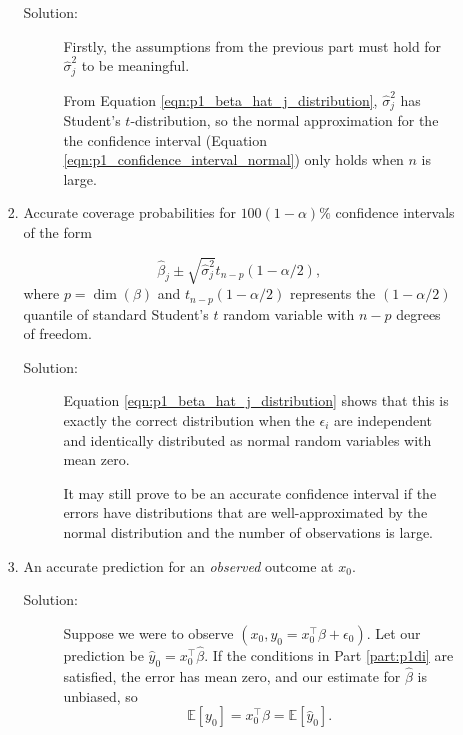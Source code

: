 \documentclass[letterpaper,11pt]{article}
\begin{document}
\begin{enumerate}
\begin{enumerate}
\begin{enumerate}
      \begin{description}
      \item[Solution:] Firstly, the assumptions from the previous part must hold
        for $\hat{\sigma}_j^2$ to be meaningful.

        From Equation \ref{eqn:p1_beta_hat_j_distribution}, $\hat{\sigma}_j^2$
        has Student's $t$-distribution, so the normal approximation for the the
        confidence interval (Equation \ref{eqn:p1_confidence_interval_normal})
        only holds when $n$ is large.
      \end{description}
            
    \item Accurate coverage probabilities for $100\left(1 - \alpha\right)\%$
      confidence intervals of the form

      \begin{equation}
        \hat{\beta}_j \pm \sqrt{\hat{\sigma}_j^2}t_{n-p}\left(1-\alpha/2\right),
        \label{eqn:p1_confidence_interval_t}
      \end{equation}
      where $p = \dim\left(\beta\right)$ and $t_{n-p}\left(1-\alpha/2\right)$
      represents the $\left(1-\alpha/2\right)$ quantile of standard Student's
      $t$ random variable with $n - p$ degrees of freedom.

      \begin{description}
      \item[Solution:] Equation \ref{eqn:p1_beta_hat_j_distribution} shows that
        this is exactly the correct distribution when the $\epsilon_i$ are
        independent and identically distributed as normal random variables with
        mean zero.

        It may still prove to be an accurate confidence interval if the errors
        have distributions that are well-approximated by the normal
        distribution and the number of observations is large.
      \end{description}
    \item An accurate prediction for an \emph{observed} outcome at $x_0$.
      
      \begin{description}
      \item[Solution:] Suppose we were to observe
        $\left(x_0, y_0 = x_0^\intercal\beta + \epsilon_0\right)$. Let our
        prediction be $\hat{y}_0 = x_0^\intercal\hat{\beta}$. If the conditions
        in Part \ref{part:p1di} are satisfied, the error has mean zero, and our
        estimate for $\hat{\beta}$ is unbiased, so
        \begin{equation*}
          \mathbb{E}\left[y_0\right]
          = x_0^\intercal\beta
          = \mathbb{E}\left[\hat{y}_0\right].
        \end{equation*}
        

\end{description}
\end{enumerate}
\end{enumerate}
\end{enumerate}
\end{document}
